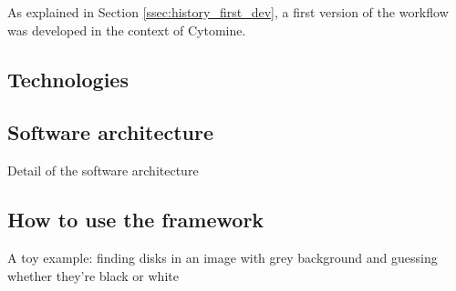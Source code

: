 As explained in Section \ref{ssec:history_first_dev}, a first version of the workflow was developed in the context of Cytomine. 
\subsection{Technologies}

\subsection{Software architecture}
Detail of the software architecture
\subsection{How to use the framework}
A toy example: finding disks in an image with grey background and guessing whether they're black or white 